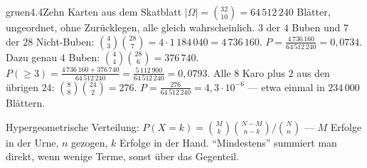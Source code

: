 \begin{loesungkarte}{gruen}{4.4}{Zehn Karten aus dem Skatblatt}
$|\Omega| = \binom{32}{10} = 64\,512\,240$ Blätter, ungeordnet, ohne Zurücklegen, alle gleich wahrscheinlich.
$3$ der $4$ Buben und $7$ der $28$ Nicht-Buben: $\binom43\binom{28}7 = 4\cdot1\,184\,040 = 4\,736\,160$. $P = \frac{4\,736\,160}{64\,512\,240} = 0{,}0734$.
Dazu genau $4$ Buben: $\binom44\binom{28}6 = 376\,740$. $P(\ge3) = \frac{4\,736\,160 + 376\,740}{64\,512\,240} = \frac{5\,112\,900}{64\,512\,240} = 0{,}0793$.
Alle $8$ Karo plus $2$ aus den übrigen $24$: $\binom88\binom{24}2 = 276$. $P = \frac{276}{64\,512\,240} = 4{,}3\cdot10^{-6}$ --- etwa einmal in $234\,000$ Blättern.
\begin{mitnehmen}\kastentext
Hypergeometrische Verteilung: $P(X = k) = \binom Mk\binom{N - M}{n - k}/\binom Nn$ --- $M$ Erfolge in der Urne, $n$ gezogen, $k$ Erfolge in der Hand. \enquote{Mindestens} summiert man direkt, wenn wenige Terme, sonst über das Gegenteil.
\end{mitnehmen}
\end{loesungkarte}

